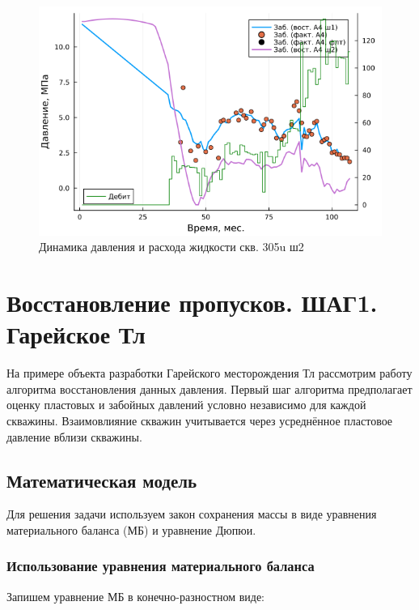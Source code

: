 \documentclass[14pt]{article}
\begin{document}
\begin{figure}[!htb]
	\centering
	\includegraphics[width=1.0\linewidth]{pic/pw_305u(3)_a4_stp2}
	\caption{Динамика давления и расхода жидкости скв. 305u ш2}
	\label{fig:pw305u3a4stp2}
\end{figure}


\section{Восстановление пропусков. ШАГ1. Гарейское Тл}
На примере объекта разработки Гарейского месторождения Тл рассмотрим  работу алгоритма восстановления данных давления. Первый шаг алгоритма предполагает оценку пластовых и забойных давлений условно независимо для каждой скважины. Взаимовлияние скважин учитывается через усреднённое пластовое давление вблизи скважины.

\subsection{Математическая модель}
    Для решения задачи используем закон сохранения массы в виде уравнения материального баланса (МБ) и уравнение Дюпюи. 
    
\subsubsection{Использование уравнения материального баланса} Запишем уравнение МБ в конечно-разностном виде:
    
\end{document}
